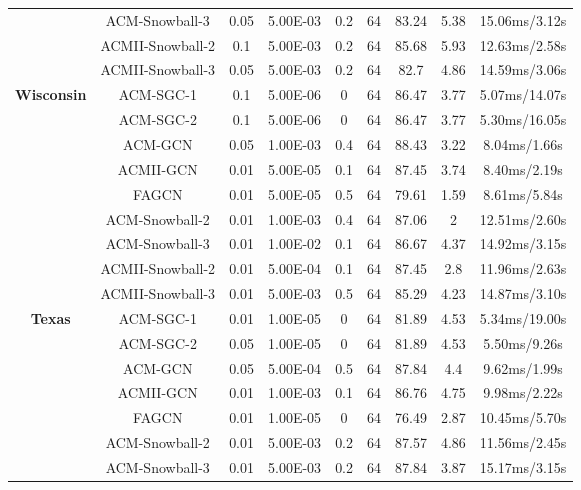 \documentclass{article}
\newcommand{\0}{{\boldsymbol{0}}}
\newcommand{\6}{{\partial}}
\newcommand{\8}{{\infty}}
\newcommand{\4}{{\nabla}}
\begin{document}
\begin{table}[htbp]
{\begin{tabular}{c|c|ccccccc}
          & ACM-Snowball-3 & 0.05  & 5.00E-03 & 0.2   & 64    & 83.24 & 5.38  & 15.06ms/3.12s \\
          & ACMII-Snowball-2 & 0.1   & 5.00E-03 & 0.2   & 64    & 85.68 & 5.93  & 12.63ms/2.58s \\
          & ACMII-Snowball-3 & 0.05  & 5.00E-03 & 0.2   & 64    & 82.7  & 4.86  & 14.59ms/3.06s \\
          \midrule
    \multirow{9}[0]{*}{\textbf{Wisconsin}} & ACM-SGC-1 & 0.1   & 5.00E-06 & 0     & 64    & 86.47 & 3.77  & 5.07ms/14.07s \\
          & ACM-SGC-2 & 0.1   & 5.00E-06 & 0     & 64    & 86.47 & 3.77  & 5.30ms/16.05s \\
          & ACM-GCN & 0.05  & 1.00E-03 & 0.4   & 64    & 88.43 & 3.22  & {8.04ms/1.66s} \\
          & ACMII-GCN & 0.01  & 5.00E-05 & 0.1   & 64    & 87.45 & 3.74  & 8.40ms/2.19s \\
          & FAGCN & 0.01  & 5.00E-05 & 0.5   & 64    & 79.61 & 1.59  & 8.61ms/5.84s \\
          & ACM-Snowball-2 & 0.01  & 1.00E-03 & 0.4   & 64    & 87.06 & 2     & 12.51ms/2.60s \\
          & ACM-Snowball-3 & 0.01  & 1.00E-02 & 0.1   & 64    & 86.67 & 4.37  & 14.92ms/3.15s \\
          & ACMII-Snowball-2 & 0.01  & 5.00E-04 & 0.1   & 64    & 87.45 & 2.8   & 11.96ms/2.63s \\
          & ACMII-Snowball-3 & 0.01  & 5.00E-03 & 0.5   & 64    & 85.29 & 4.23  & 14.87ms/3.10s \\
           \midrule
    \multirow{9}[0]{*}{\textbf{Texas}} & ACM-SGC-1 & 0.01  & 1.00E-05 & 0     & 64    & 81.89 & 4.53  & 5.34ms/19.00s \\
          & ACM-SGC-2 & 0.05  & 1.00E-05 & 0     & 64    & 81.89 & 4.53  & 5.50ms/9.26s \\
          & ACM-GCN & 0.05  & 5.00E-04 & 0.5   & 64    & 87.84 & 4.4   & 9.62ms/1.99s \\
          & ACMII-GCN & 0.01  & 1.00E-03 & 0.1   & 64    & 86.76 & 4.75  & 9.98ms/2.22s \\
          & FAGCN & 0.01  & 1.00E-05 & 0     & 64    & 76.49 & \textcolor[rgb]{ .267,  .267,  .267}{2.87} & 10.45ms/5.70s \\
          & ACM-Snowball-2 & 0.01  & 5.00E-03 & 0.2   & 64    & 87.57 & 4.86  & 11.56ms/2.45s \\
          & ACM-Snowball-3 & 0.01  & 5.00E-03 & 0.2   & 64    & 87.84 & 3.87  & 15.17ms/3.15s \\

\end{tabular}}
\end{table}
\end{document}
